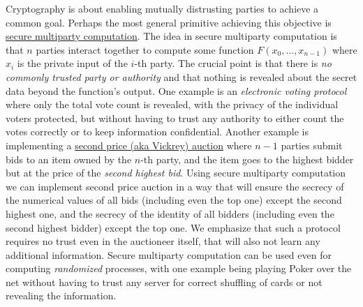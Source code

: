 Cryptography is about enabling mutually distrusting parties to achieve a
common goal. Perhaps the most general primitive achieving this objective
is
\href{https://en.wikipedia.org/wiki/Secure_multi-party_computation}{secure
multiparty computation}. The idea in secure multiparty computation is
that \(n\) parties interact together to compute some function
\(F(x_0,\ldots,x_{n-1})\) where \(x_i\) is the private input of the
\(i\)-th party. The crucial point is that there is \emph{no commonly
trusted party or authority} and that nothing is revealed about the
secret data beyond the function's output. One example is an
\emph{electronic voting protocol} where only the total vote count is
revealed, with the privacy of the individual voters protected, but
without having to trust any authority to either count the votes
correctly or to keep information confidential. Another example is
implementing a
\href{https://en.wikipedia.org/wiki/Vickrey_auction}{second price (aka
Vickrey) auction} where \(n-1\) parties submit bids to an item owned by
the \(n\)-th party, and the item goes to the highest bidder but at the
price of the \emph{second highest bid}. Using secure multiparty
computation we can implement second price auction in a way that will
ensure the secrecy of the numerical values of all bids (including even
the top one) except the second highest one, and the secrecy of the
identity of all bidders (including even the second highest bidder)
except the top one. We emphasize that such a protocol requires no trust
even in the auctioneer itself, that will also not learn any additional
information. Secure multiparty computation can be used even for
computing \emph{randomized} processes, with one example being playing
Poker over the net without having to trust any server for correct
shuffling of cards or not revealing the information.

